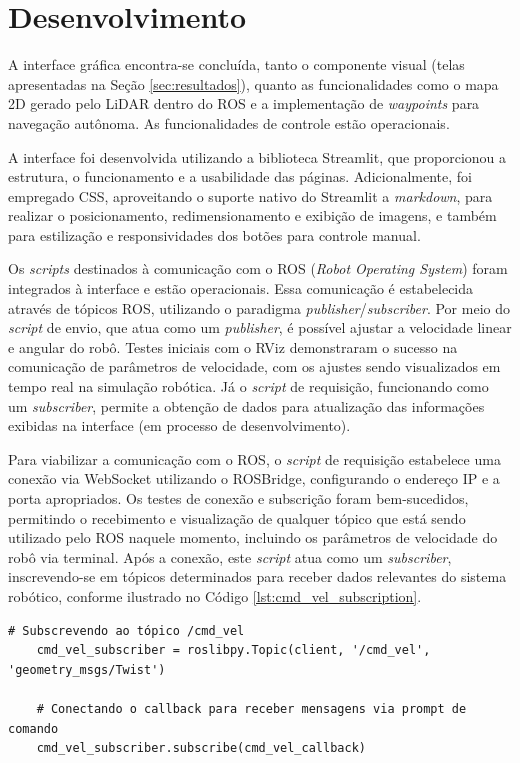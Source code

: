 \section{Desenvolvimento}

A interface gráfica encontra-se concluída, tanto o componente visual (telas apresentadas na Seção \ref{sec:resultados}), quanto as funcionalidades como o mapa 2D gerado pelo LiDAR dentro do ROS e a implementação de \textit{waypoints} para navegação autônoma. As funcionalidades de controle estão operacionais.

A interface foi desenvolvida utilizando a biblioteca Streamlit, que proporcionou a estrutura, o funcionamento e a usabilidade das páginas. Adicionalmente, foi empregado CSS, aproveitando o suporte nativo do Streamlit a \textit{markdown}, para realizar o posicionamento, redimensionamento e exibição de imagens, e também para estilização e responsividades dos botões para controle manual.

Os \textit{scripts} destinados à comunicação com o ROS (\textit{Robot Operating System}) foram integrados à interface e estão operacionais. Essa comunicação é estabelecida através de tópicos ROS, utilizando o paradigma \textit{publisher}/\textit{subscriber}. Por meio do \textit{script} de envio, que atua como um \textit{publisher}, é possível ajustar a velocidade linear e angular do robô. Testes iniciais com o RViz demonstraram o sucesso na comunicação de parâmetros de velocidade, com os ajustes sendo visualizados em tempo real na simulação robótica. Já o \textit{script} de requisição, funcionando como um \textit{subscriber}, permite a obtenção de dados para atualização das informações exibidas na interface (em processo de desenvolvimento).

Para viabilizar a comunicação com o ROS, o \textit{script} de requisição estabelece uma conexão via WebSocket utilizando o ROSBridge, configurando o endereço IP e a porta apropriados. Os testes de conexão e subscrição foram bem-sucedidos, permitindo o recebimento e visualização de qualquer tópico que está sendo utilizado pelo ROS naquele momento, incluindo os parâmetros de velocidade do robô via terminal. Após a conexão, este \textit{script} atua como um \textit{subscriber}, inscrevendo-se em tópicos determinados para receber dados relevantes do sistema robótico, conforme ilustrado no Código \ref{lst:cmd_vel_subscription}.

\begin{lstlisting}[caption={Subscrição ao tópico /cmd\_vel em ROS},label={lst:cmd_vel_subscription}]
    # Subscrevendo ao tópico /cmd_vel
    cmd_vel_subscriber = roslibpy.Topic(client, '/cmd_vel', 'geometry_msgs/Twist')

    # Conectando o callback para receber mensagens via prompt de comando
    cmd_vel_subscriber.subscribe(cmd_vel_callback)
\end{lstlisting}

